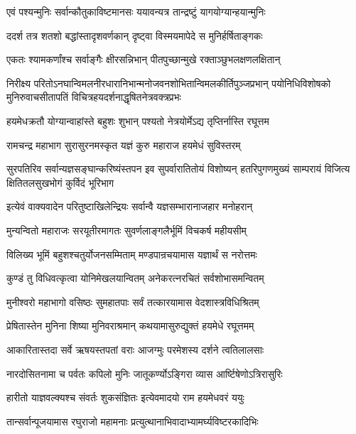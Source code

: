 \twolineshloka
{एवं पश्यन्मुनिः सर्वान्कौतुकाविष्टमानसः}
{ययावन्यत्र तान्द्रष्टुं यागयोग्यान्हयान्मुनिः}%

\twolineshloka
{ददर्श तत्र शतशो बद्धांस्तादृशवर्णकान्}
{दृष्ट्वा विस्मयमापेदे स मुनिर्हर्षिताङ्गकः}%

\twolineshloka
{एकतः श्यामकर्णांश्च सर्वाङ्गैः क्षीरसन्निभान्}
{पीतपुच्छान्मुखे रक्ताञ्छुभलक्षणलक्षितान्}%

\twolineshloka
{निरीक्ष्य परितोऽनघान्विमलनीरधारानिभान्मनोजवनशोभितान्विमलकीर्तिपुञ्जप्रभान्}
{पयोनिधिविशोषको मुनिरुवाचसीतापतिं विचित्रहयदर्शनाद्धृषितनेत्रवक्त्रप्रभः}%


\twolineshloka
{हयमेधक्रतौ योग्यान्वाहांस्ते बहुशः शुभान्}
{पश्यतो नेत्रयोर्मेऽद्य तृप्तिर्नास्ति रघूत्तम}%

\twolineshloka
{रामचन्द्र महाभाग सुरासुरनमस्कृत}
{यज्ञं कुरु महाराज हयमेधं सुविस्तरम्}%

\twolineshloka
{सुरपतिरिव सर्वान्यज्ञसङ्घान्करिष्यंस्तपन इव सुपर्वारातितोयं विशोष्यन्}
{हतरिपुगणमुख्यं साम्परायं विजित्य क्षितितलसुखभोगं कुर्विदं भूरिभाग}%

\twolineshloka
{इत्येवं वाक्यवादेन परितुष्टाखिलेन्द्रियः}
{सर्वान्वै यज्ञसम्भारानाजहार मनोहरान्}%

\twolineshloka
{मुन्यन्वितो महाराजः सरयूतीरमागतः}
{सुवर्णलाङ्गलैर्भूमिं विचकर्ष महीयसीम्}%

\twolineshloka
{विलिख्य भूमिं बहुशश्चतुर्योजनसम्मिताम्}
{मण्डपान्रचयामास यज्ञार्थं स नरोत्तमः}%

\twolineshloka
{कुण्डं तु विधिवत्कृत्वा योनिमेखलयान्वितम्}
{अनेकरत्नरचितं सर्वशोभासमन्वितम्}%

\twolineshloka
{मुनीश्वरो महाभागो वसिष्ठः सुमहातपाः}
{सर्वं तत्कारयामास वेदशास्त्रविधिश्रितम्}%

\twolineshloka
{प्रेषितास्तेन मुनिना शिष्या मुनिवराश्रमान्}
{कथयामासुरुद्युक्तं हयमेधे रघूत्तमम्}%

\twolineshloka
{आकारितास्तदा सर्वे ऋषयस्तपतां वराः}
{आजग्मुः परमेशस्य दर्शने त्वतिलालसाः}%

\twolineshloka
{नारदोसितनामा च पर्वतः कपिलो मुनिः}
{जातूकर्ण्योऽङ्गिरा व्यास आर्ष्टिषेणोऽत्रिरासुरिः}%

\twolineshloka
{हारीतो याज्ञवल्क्यश्च संवर्तः शुकसंज्ञितः}
{इत्येवमादयो राम हयमेधवरं ययुः}%

\twolineshloka
{तान्सर्वान्पूजयामास रघुराजो महामनाः}
{प्रत्युत्थानाभिवादाभ्यामर्घ्यविष्टरकादिभिः}%

